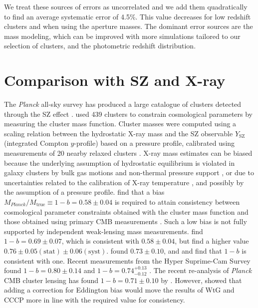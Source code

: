 \documentclass[useAMS,usenatbib]{mnras}
\begin{document}
We treat these sources of errors as uncorrelated and we add them quadratically to find an average systematic error of 4.5\%. This value decreases for low redshift clusters and when using the aperture masses. The dominant error sources are the mass modeling, which can be improved with more simulations tailored to our selection of clusters, and the photometric redshift distribution. 



\section{Comparison with SZ and X-ray}
\label{sec:hsebias}


The \textit{Planck} all-sky survey has produced a large catalogue of clusters detected through the SZ effect \citep{planckSZclusters16}. \citet{planckclustercosmo16} used 439 clusters to constrain cosmological parameters by measuring the cluster mass function. Cluster masses were computed using a scaling relation between the hydrostatic X-ray mass and the SZ observable $Y_\mathrm{SZ}$ (integrated Compton $y$-profile) based on a pressure profile, calibrated using measurements of 20 nearby relaxed clusters \citep{arnaud10}. X-ray mass estimates can be biased because the underlying assumption of hydrostatic equilibrium is violated in galaxy clusters by bulk gas motions and non-thermal pressure support \citep[e.g.][]{rasia12}, or due to uncertainties related to the calibration of X-ray temperature \citep{mahdavi13, schellenberger15}, and possibly by the assumption of a pressure profile. \citet{planckclustercosmo16} find that a bias $M_{Planck}/M_\mathrm{true} \equiv 1-b = 0.58 \pm 0.04$ is required to attain consistency between cosmological parameter constraints obtained with the cluster mass function and those obtained using primary CMB measurements \citep{planckcosmo16}. Such a low bias is not fully supported by independent weak-lensing mass measurements. \citet{vonderlinden14b} find $1-b = 0.69 \pm 0.07$, which is consistent with $0.58 \pm 0.04$, but  find a higher value $0.76 \pm 0.05 \mathrm{(stat)} \pm 0.06 \mathrm{(syst)}$. \citet{pennalima16} found $0.73 \pm 0.10$, and \citet{smith16} and \citet{gruen14} find that $1-b$ is consistent with one. Recent measurements from the Hyper Suprime-Cam Survey found $1-b=0.80\pm{0.14}$ \citep{medezinski18b} and $1-b=0.74^{+0.13}_{-0.12}$ \citep{miyatake19}. The recent re-analysis of \textit{Planck} CMB cluster lensing has found $1-b=0.71 \pm 0.10$ by \citet{zubeldia19}. However, \citet{battaglia16} showed that adding a correction for Eddington bias would move the results of WtG and CCCP more in line with the required value for consistency.
\end{document}
